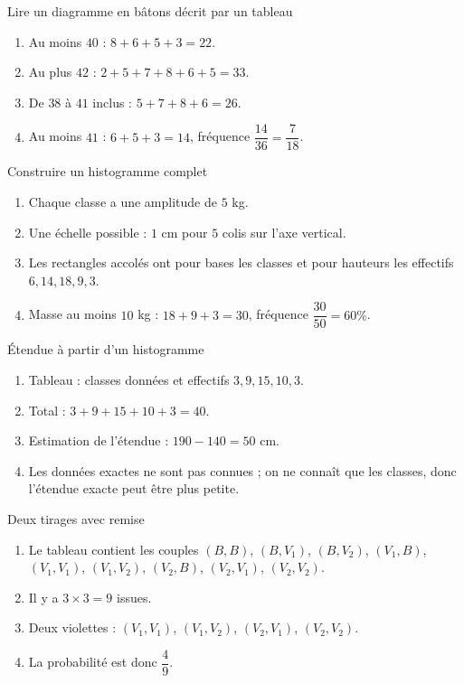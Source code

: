 \documentclass[11pt,a4paper]{article}
\newcounter{corr}
\begin{document}
\begin{corrbox}{Lire un diagramme en bâtons décrit par un tableau}
\begin{enumerate}
\item Au moins $40$ : $8+6+5+3=22$.
\item Au plus $42$ : $2+5+7+8+6+5=33$.
\item De $38$ à $41$ inclus : $5+7+8+6=26$.
\item Au moins $41$ : $6+5+3=14$, fréquence $\dfrac{14}{36}=\dfrac{7}{18}$.
\end{enumerate}
\end{corrbox}

\begin{corrbox}{Construire un histogramme complet}
\begin{enumerate}
\item Chaque classe a une amplitude de $5$ kg.
\item Une échelle possible : $1$ cm pour $5$ colis sur l'axe vertical.
\item Les rectangles accolés ont pour bases les classes et pour hauteurs les effectifs $6,14,18,9,3$.
\item Masse au moins $10$ kg : $18+9+3=30$, fréquence $\dfrac{30}{50}=60\%$.
\end{enumerate}
\end{corrbox}

\begin{corrbox}{Étendue à partir d'un histogramme}
\begin{enumerate}
\item Tableau : classes données et effectifs $3,9,15,10,3$.
\item Total : $3+9+15+10+3=40$.
\item Estimation de l'étendue : $190-140=50$ cm.
\item Les données exactes ne sont pas connues ; on ne connaît que les classes, donc l'étendue exacte peut être plus petite.
\end{enumerate}
\end{corrbox}

\begin{corrbox}{Deux tirages avec remise}
\begin{enumerate}
\item Le tableau contient les couples $(B,B)$, $(B,V_1)$, $(B,V_2)$, $(V_1,B)$, $(V_1,V_1)$, $(V_1,V_2)$, $(V_2,B)$, $(V_2,V_1)$, $(V_2,V_2)$.
\item Il y a $3\times3=9$ issues.
\item Deux violettes : $(V_1,V_1)$, $(V_1,V_2)$, $(V_2,V_1)$, $(V_2,V_2)$.
\item La probabilité est donc $\dfrac49$.
\end{enumerate}
\end{corrbox}
\end{document}
